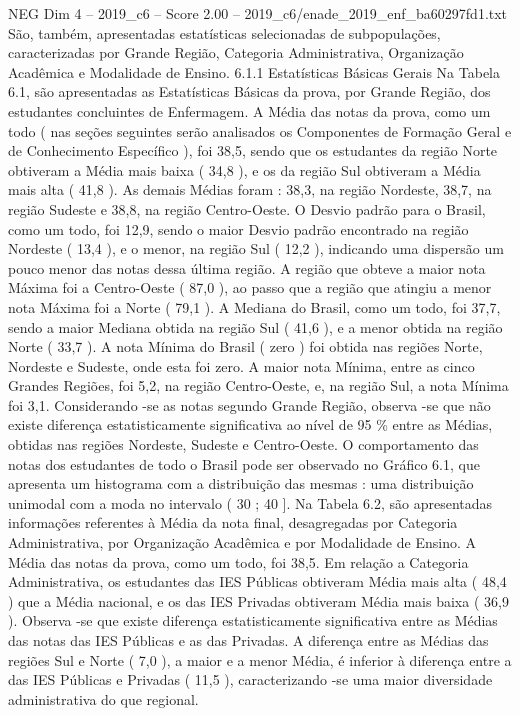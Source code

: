 \begin{textsample}{NEG Dim 4 – 2019\_c6 – Score 2.00 – 2019\_c6/enade\_2019\_enf\_ba60297fd1.txt}
São, também, apresentadas estatísticas selecionadas de subpopulações, caracterizadas por Grande Região, Categoria Administrativa, Organização Acadêmica e Modalidade de Ensino. 6.1.1 Estatísticas Básicas Gerais Na Tabela 6.1, são apresentadas as Estatísticas Básicas da prova, por Grande Região, dos estudantes concluintes de Enfermagem.
A Média das notas da prova, como um todo ( nas seções seguintes serão analisados os Componentes de Formação Geral e de Conhecimento Específico ), foi 38,5, sendo que os estudantes da região Norte obtiveram a Média mais baixa ( 34,8 ), e os da região Sul obtiveram a Média mais alta ( 41,8 ).
As demais Médias foram : 38,3, na região Nordeste, 38,7, na região Sudeste e 38,8, na região Centro-Oeste.
O Desvio padrão para o Brasil, como um todo, foi 12,9, sendo o maior Desvio padrão encontrado na região Nordeste ( 13,4 ), e o menor, na região Sul ( 12,2 ), indicando uma dispersão um pouco menor das notas dessa última região.
A região que obteve a maior nota Máxima foi a Centro-Oeste ( 87,0 ), ao passo que a região que atingiu a menor nota Máxima foi a Norte ( 79,1 ).
A Mediana do Brasil, como um todo, foi 37,7, sendo a maior Mediana obtida na região Sul ( 41,6 ), e a menor obtida na região Norte ( 33,7 ).
A nota Mínima do Brasil ( zero ) foi obtida nas regiões Norte, Nordeste e Sudeste, onde esta foi zero.
A maior nota Mínima, entre as cinco Grandes Regiões, foi 5,2, na região Centro-Oeste, e, na região Sul, a nota Mínima foi 3,1.
Considerando -se as notas segundo Grande Região, observa -se que não existe diferença estatisticamente significativa ao nível de 95 \% entre as Médias, obtidas nas regiões Nordeste, Sudeste e Centro-Oeste.
O comportamento das notas dos estudantes de todo o Brasil pode ser observado no Gráfico 6.1, que apresenta um histograma com a distribuição das mesmas : uma distribuição unimodal com a moda no intervalo ( 30 ; 40 ].
Na Tabela 6.2, são apresentadas informações referentes à Média da nota final, desagregadas por Categoria Administrativa, por Organização Acadêmica e por Modalidade de Ensino.
A Média das notas da prova, como um todo, foi 38,5.
Em relação a Categoria Administrativa, os estudantes das IES Públicas obtiveram Média mais alta ( 48,4 ) que a Média nacional, e os das IES Privadas obtiveram Média mais baixa ( 36,9 ).
Observa -se que existe diferença estatisticamente significativa entre as Médias das notas das IES Públicas e as das Privadas.
A diferença entre as Médias das regiões Sul e Norte ( 7,0 ), a maior e a menor Média, é inferior à diferença entre a das IES Públicas e Privadas ( 11,5 ), caracterizando -se uma maior diversidade administrativa do que regional.

\end{textsample}
